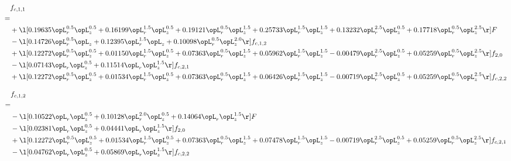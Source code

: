 \begin{alignat}{2} 
\label{eq:f_11_2} 
& f_{c,1,1} \nonumber \\ 
 = \\ 
& + \l[  0.19635 \opL_r^{0.5} \opL_z^{0.5} +  0.16199 \opL_r^{1.5} \opL_z^{0.5} +  0.19121 \opL_r^{0.5} \opL_z^{1.5} +  0.25733 \opL_r^{1.5} \opL_z^{1.5} +  0.13232 \opL_r^{2.5} \opL_z^{0.5} +  0.17718 \opL_r^{0.5} \opL_z^{2.5}  \r] F \nonumber \\ 
& - \l[  0.14726 \opL_r^{0.5} \opL_z +  0.12395 \opL_r^{1.5} \opL_z +  0.10098 \opL_r^{0.5} \opL_z^{2.0}  \r] f_{c,1,2} \nonumber \\ 
& + \l[  0.12272 \opL_r^{0.5} \opL_z^{0.5} +  0.01150 \opL_r^{1.5} \opL_z^{0.5} +  0.07363 \opL_r^{0.5} \opL_z^{1.5} +  0.05962 \opL_r^{1.5} \opL_z^{1.5}   -0.00479 \opL_r^{2.5} \opL_z^{0.5} +  0.05259 \opL_r^{0.5} \opL_z^{2.5}  \r] f_{2,0} \nonumber \\ 
& - \l[  0.07143 \opL_r \opL_z^{0.5} +  0.11514 \opL_r \opL_z^{1.5}  \r] f_{c,2,1} \nonumber \\ 
& + \l[  0.12272 \opL_r^{0.5} \opL_z^{0.5} +  0.01534 \opL_r^{1.5} \opL_z^{0.5} +  0.07363 \opL_r^{0.5} \opL_z^{1.5} +  0.06426 \opL_r^{1.5} \opL_z^{1.5}   -0.00719 \opL_r^{2.5} \opL_z^{0.5} +  0.05259 \opL_r^{0.5} \opL_z^{2.5}  \r] f_{c,2,2} \nonumber \\ 
\end{alignat} 


\begin{alignat}{2} 
\label{eq:f_12_2} 
& f_{c,1,2} \nonumber \\ 
 = \\ 
& - \l[  0.10522 \opL_r \opL_z^{0.5} +  0.10128 \opL_r^{2.0} \opL_z^{0.5} +  0.14064 \opL_r \opL_z^{1.5}  \r] F \nonumber \\ 
& - \l[  0.02381 \opL_r \opL_z^{0.5} +  0.04441 \opL_r \opL_z^{1.5}  \r] f_{2,0} \nonumber \\ 
& + \l[  0.12272 \opL_r^{0.5} \opL_z^{0.5} +  0.01534 \opL_r^{1.5} \opL_z^{0.5} +  0.07363 \opL_r^{0.5} \opL_z^{1.5} +  0.07478 \opL_r^{1.5} \opL_z^{1.5}   -0.00719 \opL_r^{2.5} \opL_z^{0.5} +  0.05259 \opL_r^{0.5} \opL_z^{2.5}  \r] f_{c,2,1} \nonumber \\ 
& - \l[  0.04762 \opL_r \opL_z^{0.5} +  0.05869 \opL_r \opL_z^{1.5}  \r] f_{c,2,2} \nonumber \\ 
\end{alignat} 


